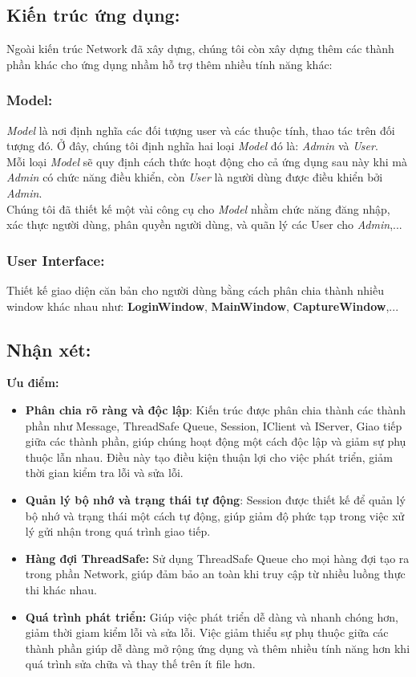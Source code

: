 

\subsection{Kiến trúc ứng dụng: }

Ngoài kiến trúc Network đã xây dựng, chúng tôi còn xây dựng thêm các thành phần khác cho ứng dụng nhầm hỗ trợ thêm nhiều tính năng khác:

\subsubsection{Model: }
\textit{Model} là nơi định nghĩa các đối tượng user và các thuộc tính, thao tác trên đối tượng đó. Ở đây, chúng tôi định nghĩa hai loại \textit{Model} đó là: \textit{Admin} và \textit{User}. \\
Mỗi loại \textit{Model} sẽ quy định cách thức hoạt động cho cả ứng dụng sau này khi mà \textit{Admin} có chức năng điều khiển, còn \textit{User} là người dùng được điều khiển bởi \textit{Admin}. \\
Chúng tôi đã thiết kế một vài công cụ cho \textit{Model} nhằm chức năng đăng nhập, xác thực người dùng, phân quyền người dùng, và quãn lý các User cho \textit{Admin},...


\subsubsection{User Interface: }
Thiết kế giao diện căn bản cho người dùng bằng cách phân chia thành nhiều window khác nhau như: \textbf{LoginWindow}, \textbf{MainWindow}, \textbf{CaptureWindow},...

\subsection{Nhận xét: }

\textbf{Ưu điểm: }
\begin{itemize}
	\item \textbf{Phân chia rõ ràng và độc lập}: Kiến trúc được phân chia thành các thành phần như Message, ThreadSafe Queue, Session, IClient và IServer, Giao tiếp giữa các thành phần, giúp chúng hoạt động một cách độc lập và giảm sự phụ thuộc lẫn nhau. Điều này tạo điều kiện thuận lợi cho việc phát triển, giảm thời gian kiểm tra lỗi và sửa lỗi.
	\item \textbf{Quản lý bộ nhớ và trạng thái tự động}: Session được thiết kế để quản lý bộ nhớ và trạng thái một cách tự động, giúp giảm độ phức tạp trong việc xử lý gửi nhận trong quá trình giao tiếp.
	\item \textbf{Hàng đợi ThreadSafe:} Sử dụng ThreadSafe Queue cho mọi hàng đợi tạo ra trong phần Network, giúp đảm bảo an toàn khi truy cập từ nhiều luồng thực thi khác nhau.
	\item \textbf{Quá trình phát triển: } Giúp việc phát triển dễ dàng và nhanh chóng hơn, giảm thời giam kiểm lỗi và sửa lỗi. Việc giảm thiểu sự phụ thuộc giữa các thành phần giúp dễ dàng mở rộng ứng dụng và thêm nhiều tính năng hơn khi quá trình sửa chữa và thay thế trên ít file hơn.
\end{itemize}

